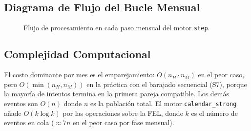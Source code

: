 \documentclass{llncs}
\begin{document}
\subsection{Diagrama de Flujo del Bucle Mensual}

\begin{figure}[H]
\centering
{}
\caption{Flujo de procesamiento en cada paso mensual del motor \texttt{step}.}
\label{fig:flujo}
\end{figure}

\subsection{Complejidad Computacional}

El costo dominante por mes es el emparejamiento: $O(n_H \cdot n_M)$ en el
peor caso, pero $O(\min(n_H, n_M))$ en la práctica con el barajado
secuencial (S7), porque la mayoría de intentos termina en la primera pareja
compatible.
Los demás eventos son $O(n)$ donde $n$ es la población total.
El motor \texttt{calendar\_strong} añade $O(k \log k)$ por las operaciones
sobre la FEL, donde $k$ es el número de eventos en cola ($\approx 7n$
en el peor caso por fase mensual).
\end{document}

